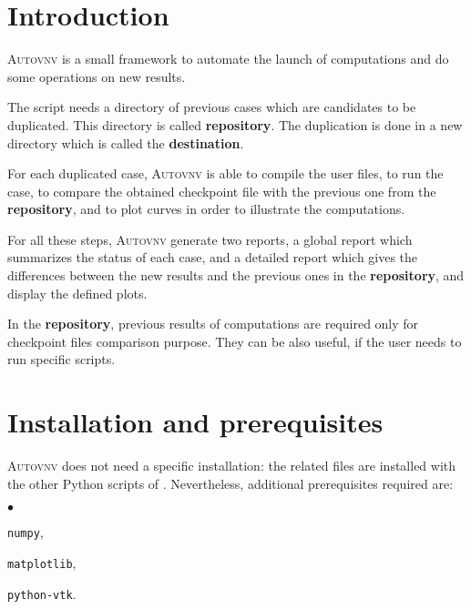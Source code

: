\documentclass[a4paper,10pt,twoside]{csshortdoc}
\begin{document}
\def\contentsname{\textbf{\normalsize TABLE OF CONTENTS}\pdfbookmark[1]{Table of
contents}{contents}}

\renewcommand{\logocs}{cs_logo_wave}

\large
\makepdgCS
\normalsize

\passepage

\begin{center}\begin{singlespace}
\tableofcontents
\end{singlespace}\end{center}
%
\section{Introduction}

\textsc{Autovnv} is a small framework to automate the launch of \CS computations
and do some operations on new results.

The script needs a directory of previous \CS cases which are candidates to be
duplicated. This directory is called \textbf{repository}. The duplication is
done in a new directory which is called the \textbf{destination}.

For each duplicated case, \textsc{Autovnv} is able to compile the user files, to
run the case, to compare the obtained checkpoint file with the previous one from
the \textbf{repository}, and to plot curves in order to illustrate the
computations.

For all these steps, \textsc{Autovnv} generate two reports, a global report
which summarizes the status of each case, and a detailed report which gives the
differences between the new results and the previous ones in the
\textbf{repository}, and display the defined plots.

In the \textbf{repository}, previous results of computations are required only
for checkpoint files comparison purpose. They can be also useful, if the user
needs to run specific scripts.

\section{Installation and prerequisites}

\textsc{Autovnv} does not need a specific installation: the related files are
installed with the other Python scripts of \CS. Nevertheless, additional
prerequisites required are:
\begin{list}{$\bullet$}{}
\item \texttt{numpy},
\item \texttt{matplotlib},
\item \texttt{python-vtk}.
\end{list}
\end{document}

